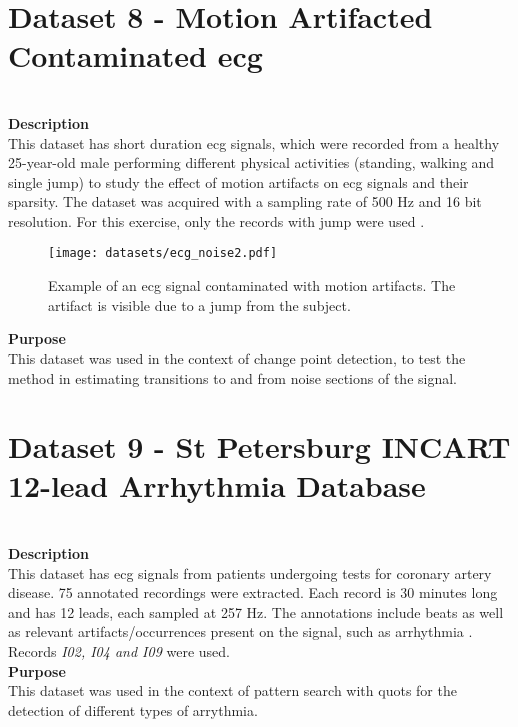 \section{Dataset 8 - Motion Artifacted Contaminated \gls{ecg}}\\
\textbf{Description}\\
This dataset has short duration \gls{ecg} signals, which were recorded from a healthy 25-year-old male performing different physical activities (standing, walking and single jump) to study the effect of motion artifacts on \gls{ecg} signals and their sparsity. The dataset was acquired with a sampling rate of 500 Hz and 16 bit resolution. For this exercise, only the records with jump were used \cite{dataset7, PhysioNet}.\\

\begin{figure}
\centering
\texttt{[image: datasets/ecg\_noise2.pdf]}
\caption{Example of an \gls{ecg} signal contaminated with motion artifacts. The artifact is visible due to a jump from the subject.}
\label{fig:ecg2_dataset}
\end{figure}

\textbf{Purpose}\\
This dataset was used in the context of change point detection, to test the method in estimating transitions to and from noise sections of the signal.

\section{Dataset 9 - St Petersburg INCART 12-lead Arrhythmia Database}\\
\textbf{Description}\\
This dataset has \gls{ecg} signals from patients undergoing tests for coronary artery disease. 75 annotated recordings were extracted. Each record is 30 minutes long and has 12 leads, each sampled at 257 Hz. The annotations include beats as well as relevant artifacts/occurrences present on the signal, such as arrhythmia \cite{PhysioNet}. Records \textit{I02, I04 and I09} were used.\\
\textbf{Purpose}\\
This dataset was used in the context of pattern search with \gls{quots} for the detection of different types of arrythmia.


